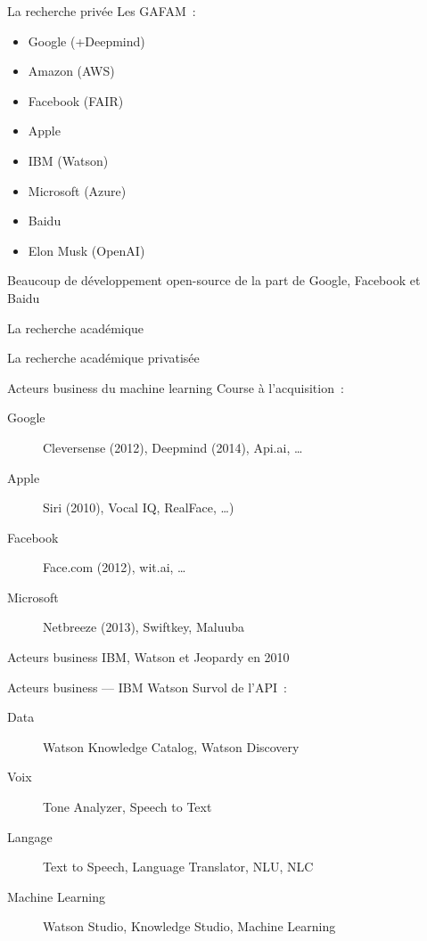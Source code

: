 \begin{frame}{La recherche privée}
  Les GAFAM~:

  \begin{itemize}
  \item Google (+Deepmind)
  \item Amazon (AWS)
  \item Facebook (FAIR)
  \item Apple 
  \item IBM (Watson)
  \item Microsoft (Azure)
  \item Baidu
  \item Elon Musk (OpenAI)
  \end{itemize}

  Beaucoup de développement open-source de la part de Google, Facebook et Baidu
\end{frame}

\begin{frame}{La recherche académique}
\end{frame}

\begin{frame}{La recherche académique privatisée}
\end{frame}

\begin{frame}{Acteurs business du machine learning}
  Course à l'acquisition~:
  \begin{description}
    \item[Google] Cleversense (2012), Deepmind (2014), Api.ai, …
    \item[Apple] Siri (2010), Vocal IQ, RealFace, …)
    \item[Facebook] Face.com (2012), wit.ai, …
    \item[Microsoft] Netbreeze (2013), Swiftkey, Maluuba
    \end{description}
\end{frame}

\begin{frame}{Acteurs business}
  IBM, Watson et Jeopardy en 2010
\end{frame}

\begin{frame}{Acteurs business --- IBM Watson}
  Survol de l'API~:
  \begin{description}
    \item[Data] Watson Knowledge Catalog, Watson Discovery
    \item[Voix] Tone Analyzer, Speech to Text
    \item[Langage] Text to Speech, Language Translator, NLU, NLC
    \item[Machine Learning] Watson Studio, Knowledge Studio, Machine Learning
  \end{description}
\end{frame}

